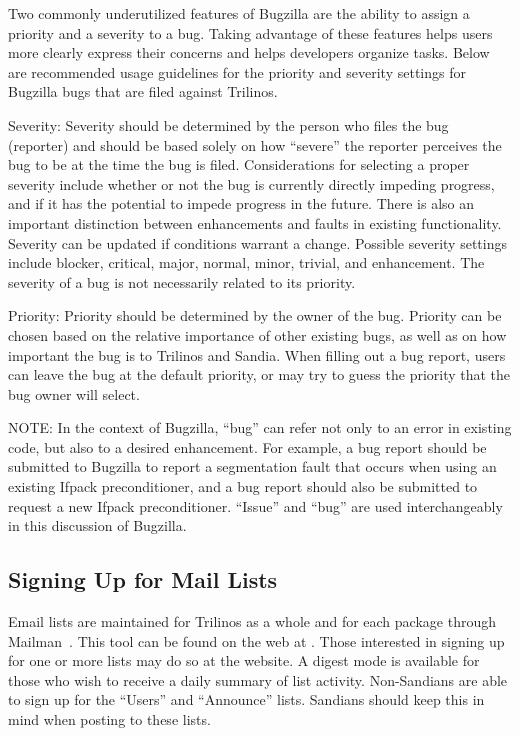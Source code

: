 \documentclass[12pt,relax]{TrilinosUserGuide}
\begin{document}
Two commonly underutilized features of Bugzilla are the ability to assign a
priority and a severity to a bug.  Taking advantage of these features helps
users more clearly express their concerns and helps developers organize tasks.
Below are recommended usage guidelines for the priority and severity settings
for Bugzilla bugs that are filed against Trilinos.
                                                                                
Severity: Severity should be determined by the person who files the bug
(reporter) and should be based solely on how “severe” the reporter perceives
the bug to be at the time the bug is filed.  Considerations for selecting a
proper severity include whether or not the bug is currently directly impeding
progress, and if it has the potential to impede progress in the future.  There
is also an important distinction between enhancements and faults in existing
functionality.  Severity can be updated if conditions warrant a change.
Possible severity settings include blocker, critical, major, normal, minor,
trivial, and enhancement.  The severity of a bug is not necessarily related to
its priority.

Priority: Priority should be determined by the owner of the bug.  Priority can
be chosen based on the relative importance of other existing bugs, as well as
on how important the bug is to Trilinos and Sandia.  When filling out a bug 
report, users can leave the bug at the default priority, or may try to guess
the priority that the bug owner will select.

NOTE: In the context of Bugzilla, ``bug'' can refer not only to an error in 
existing code, but also to a desired enhancement.  For example, a bug report 
should be submitted to Bugzilla to report a segmentation fault that occurs 
when using an existing Ifpack preconditioner, and a bug report should also be
submitted to request a new Ifpack preconditioner.  ``Issue'' and ``bug'' are 
used interchangeably in this discussion of Bugzilla.

\subsection{Signing Up for Mail Lists}
\label{subsect:MailMan}
Email lists are maintained for Trilinos as a whole and for each package 
through Mailman~\cite{Mailman}.  This tool can be found on the web at 
\newline
{}.  
Those interested in signing 
up for one or more lists may do so at the website.  A digest mode is 
available for those who wish to receive a daily summary of list activity.  
Non-Sandians are able to sign up for the ``Users'' and ``Announce'' 
lists.  Sandians should keep this in mind when posting to these lists.
\end{document}
